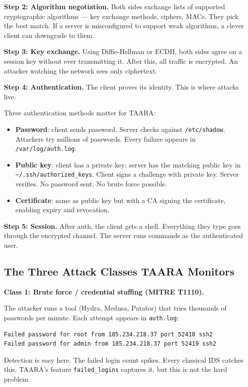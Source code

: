 \documentclass[11pt,a4paper]{article}
\begin{document}
\textbf{Step 2: Algorithm negotiation.} Both sides exchange lists of supported cryptographic algorithms — key exchange methods, ciphers, MACs. They pick the best match. If a server is misconfigured to support weak algorithms, a clever client can downgrade to them.

\textbf{Step 3: Key exchange.} Using Diffie-Hellman or ECDH, both sides agree on a session key without ever transmitting it. After this, all traffic is encrypted. An attacker watching the network sees only ciphertext.

\textbf{Step 4: Authentication.} The client proves its identity. This is where attacks live.

Three authentication methods matter for TAARA:
\begin{itemize}
  \item \textbf{Password}: client sends password. Server checks against \texttt{/etc/shadow}. Attackers try millions of passwords. Every failure appears in \texttt{/var/log/auth.log}.
  \item \textbf{Public key}: client has a private key; server has the matching public key in \texttt{\~{}/.ssh/authorized\_keys}. Client signs a challenge with private key. Server verifies. No password sent. No brute force possible.
  \item \textbf{Certificate}: same as public key but with a CA signing the certificate, enabling expiry and revocation.
\end{itemize}

\textbf{Step 5: Session.} After auth, the client gets a shell. Everything they type goes through the encrypted channel. The server runs commands as the authenticated user.

\subsection{The Three Attack Classes TAARA Monitors}

\textbf{Class 1: Brute force / credential stuffing (MITRE T1110).}

The attacker runs a tool (Hydra, Medusa, Patator) that tries thousands of passwords per minute. Each attempt appears in \texttt{auth.log}:
\begin{lstlisting}[language=bash]
Failed password for root from 185.234.218.37 port 52418 ssh2
Failed password for admin from 185.234.218.37 port 52419 ssh2
\end{lstlisting}

Detection is easy here. The failed login count spikes. Every classical IDS catches this. TAARA's feature \texttt{failed\_logins} captures it, but this is not the hard problem.
\end{document}
